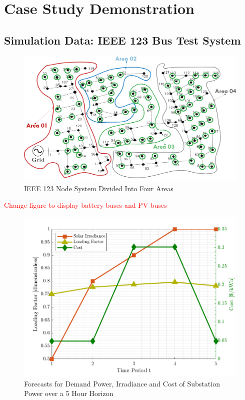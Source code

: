 \documentclass[../../outputs/main.tex]{subfiles}
\begin{document}
\section{Case Study Demonstration}

\subsection{Simulation Data: IEEE 123 Bus Test System}

\begin{figure}[h!]
    \centering
    \includegraphics[width=\linewidth]{../figures/ieee123-FourAreas.png}
    \caption{IEEE 123 Node System Divided Into Four Areas}
    \label{fig:ieee123-four-area-figure}
\end{figure}

\textcolor{red}{Change figure to display battery buses and PV buses}

\begin{figure}[h!]
    \centering
    \includegraphics[height=0.25\textheight]{../figures/T5-inputCurves/InputCurves_Horizon_5.png}
    \caption{Forecasts for Demand Power, Irradiance and Cost of Substation Power over a 5 Hour Horizon}
    \label{fig:inputCurve-5}
\end{figure}
\end{document}
